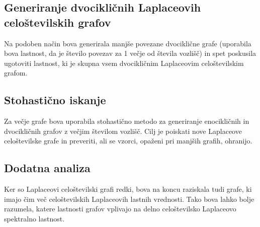 \documentclass{article}
\begin{document}
\subsection{Generiranje dvocikličnih Laplaceovih celoštevilskih grafov}
Na podoben način bova generirala manjše povezane dvociklične grafe (uporabila bova lastnost, da je število povezav za 1 večje od števila vozlišč) in spet poskusila
ugotoviti lastnost, ki je skupna vsem dvocikličnim Laplaceovim celoštevilskim grafom. \\

\subsection{Stohastično iskanje}
Za večje grafe bova uporabila stohastično metodo za generiranje enocikličnih in dvocikličnih grafov z večjim številom vozlišč. 
Cilj je poiskati nove Laplaceove celoštevilske grafe in preveriti, ali se vzorci, opaženi pri manjših grafih, ohranijo.\\

\subsection{Dodatna analiza}
Ker so Laplaceovi celoštevilski grafi redki, bova na koncu raziskala tudi grafe, ki imajo čim več celoštevilskih Laplaceovih lastnih vrednosti. 
Tako bova lahko bolje razumela, katere lastnosti grafov vplivajo na delno celoštevilsko Laplaceovo spektralno lastnost.
\end{document}
